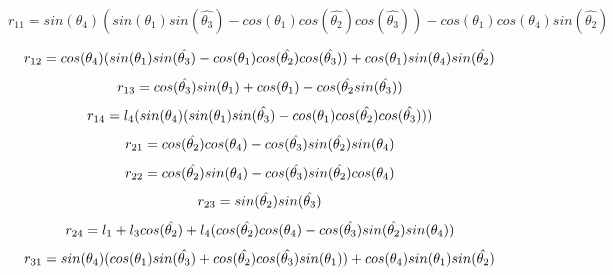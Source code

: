\documentclass[conference]{IEEEtran}
\begin{document}
\begin{strip}
\begin{equation}
r_{11} = sin(\theta_{4})(sin(\theta_{1})sin(\hat{\theta_{3}})-cos(\theta_{1})cos(\hat{\theta_{2}})cos(\hat{\theta_{3}}))-cos(\theta_{1})cos(\theta_{4})sin(\hat{\theta_{2}})
\end{equation}

\begin{equation}
r_{12} = cos(\theta_{4})(sin(\theta_{1})sin(\hat{\theta_{3}})- cos(\theta_{1})cos(\hat{\theta_{2}})cos(\hat{\theta_{3}}))+ cos(\theta_{1})sin(\theta_{4})sin(\hat{\theta_{2}})\\
\end{equation}
\begin{equation}
r_{13} = cos(\hat{\theta_{3}})sin(\theta_{1})+cos(\theta_{1})-cos(\hat{\theta_{2}}sin(\hat{\theta_{3}}))\\
\end{equation}
\begin{equation}
r_{14} = l_{4}( sin(\theta_{4})( sin(\theta_{1})sin(\hat{\theta_{3}})- cos(\theta_{1})cos(\hat{\theta_{2}})cos(\hat{\theta_{3}}) ) )\\
\end{equation}
\begin{equation}
r_{21} = cos(\hat{\theta_{2}})cos(\theta_{4})- cos(\hat{\theta_{3}})sin(\hat{\theta_{2}})sin(\theta_{4})\\
\end{equation}
\begin{equation}
r_{22} = cos(\hat{\theta_{2}})sin(\theta_{4})- cos(\hat{\theta_{3}})sin(\hat{\theta_{2}})cos(\theta_{4})\\
\end{equation}
\begin{equation}
r_{23} = sin(\hat{\theta_{2}})sin(\hat{\theta_{3}})\\
\end{equation}
\begin{equation}
r_{24} = l_{1}+ l_{3}cos(\hat{\theta_{2}})+ l_{4}(cos(\hat{\theta_{2}})cos(\theta_{4})- cos(\hat{\theta_{3}})sin(\hat{\theta_{2}})sin(\theta_{4}))\\
\end{equation}
\begin{equation}
r_{31} = sin(\theta_{4})(  cos(\theta_{1})sin(\hat{\theta_{3}})+ cos(\hat{\theta_{2}})cos(\hat{\theta_{3}})sin(\theta_{1}))+ cos(\theta_{4})sin(\theta_{1})sin(\hat{\theta_{2}})\\
\end{equation}


\end{strip}
\end{document}
